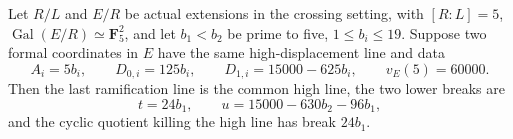 \begin{lemma}
\label{lem:B-RD92-common-high}
Let \(R/L\) and \(E/R\) be actual extensions in the crossing
setting, with \([R:L]=5\), \(\operatorname{Gal}(E/R)\simeq
\mathbf F_5^2\), and let \(b_1<b_2\) be prime to five,
\(1\le b_i\le19\). Suppose two formal coordinates in \(E\)
have the same high-displacement line and data
\[
 A_i=5b_i,\qquad D_{0,i}=125b_i,\qquad
 D_{1,i}=15000-625b_i,\qquad v_E(5)=60000.             \tag{B-RD92.10}
\]
Then the last ramification line is the common high line, the two
lower breaks are
\[
 t=24b_1,\qquad u=15000-630b_2-96b_1,                 \tag{B-RD92.11}
\]
and the cyclic quotient killing the high line has break \(24b_1\).
\end{lemma}
